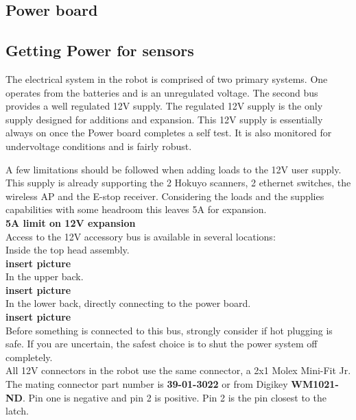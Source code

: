 \subsection{Power board}

\subsection{Getting Power for sensors}
The electrical system in the robot is comprised of two primary systems. One operates from the batteries and is an unregulated voltage. The second bus provides a well regulated 12V supply. The regulated 12V supply is the only supply designed for additions and expansion. This 12V supply is essentially always on once the Power board completes a self test. It is also monitored for undervoltage conditions and is fairly robust.


A few limitations should be followed when adding loads to the 12V user supply. This supply is already supporting the 2 Hokuyo scanners, 2 ethernet switches, the wireless AP and the E-stop receiver. Considering the loads and the supplies capabilities with some headroom this leaves 5A for expansion.\\

{\bf 5A limit on 12V expansion}\\

Access to the 12V accessory bus is available in several locations:\\

Inside the top head assembly.\\

{\bf insert picture}\\


In the upper back.\\

{\bf insert picture}\\


In the lower back, directly connecting to the power board.\\

{\bf insert picture}\\

Before something is connected to this bus, strongly consider if hot plugging is safe. If you are uncertain, the safest choice is to shut the power system off completely.\\

All 12V connectors in the robot use the same connector, a 2x1 Molex Mini-Fit Jr. The mating connector part number is {\bf 39-01-3022} or from Digikey {\bf WM1021-ND}. Pin one is negative and pin 2 is positive. Pin 2 is the pin closest to the latch.
